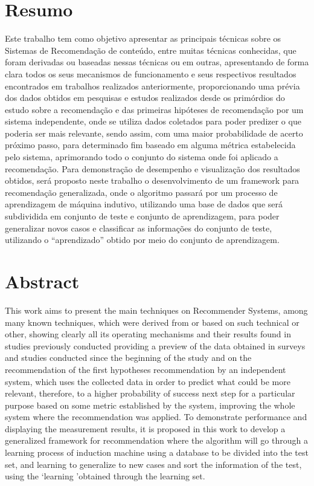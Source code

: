 \documentclass[12pt,
				openright,
				twoside,
				a4paper,
				apter=TITLE,
				section=TITLE,
				subsection=TITLE,
				chapter=TITLE,
				english,
				french,
				spanish,
				brazil]{abntex2}
\begin{document}
\chapter*{Resumo}
Este trabalho tem como objetivo apresentar as principais técnicas sobre os Sistemas de Recomendação de conteúdo, entre muitas técnicas conhecidas, que foram derivadas ou baseadas nessas técnicas ou em outras, apresentando de forma clara todos  os seus mecanismos de funcionamento e seus respectivos resultados encontrados em trabalhos realizados anteriormente, proporcionando uma prévia dos dados obtidos em pesquisas e estudos realizados desde os primórdios do estudo sobre a recomendação e das primeiras hipóteses de recomendação por um sistema independente, onde se utiliza dados coletados para poder predizer o que poderia ser mais relevante, sendo assim, com uma maior probabilidade de acerto próximo passo, para determinado fim baseado em alguma métrica estabelecida pelo sistema, aprimorando todo o conjunto do sistema onde foi aplicado a recomendação. Para demonstração de desempenho e visualização dos resultados obtidos, será proposto neste trabalho o desenvolvimento de um framework para recomendação generalizada, onde o algoritmo passará por um processo de aprendizagem de máquina indutivo, utilizando uma base de dados que será subdividida em conjunto de teste e conjunto de aprendizagem, para poder generalizar novos casos e classificar as informações do conjunto de teste, utilizando o ``aprendizado'' obtido por meio do conjunto de aprendizagem. 


\chapter*{Abstract}
This work aims to present the main techniques on Recommender Systems, among many known techniques, which were derived from or based on such technical or other, showing clearly all its operating mechanisms and their results found in studies previously conducted providing a preview of the data obtained in surveys and studies conducted since the beginning of the study and on the recommendation of the first hypotheses recommendation by an independent system, which uses the collected data in order to predict what could be more relevant, therefore, to a higher probability of success next step for a particular purpose based on some metric established by the system, improving the whole system where the recommendation was applied. To demonstrate performance and displaying the measurement results, it is proposed in this work to develop a generalized framework for recommendation where the algorithm will go through a learning process of induction machine using a database to be divided into the test set, and learning to generalize to new cases and sort the information of the test, using the `learning 'obtained through the learning set.
\end{document}
